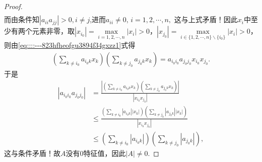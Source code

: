 \documentclass[../../main.tex]{subfiles}%
\begin{document}
\begin{proof}
\begin{align*}
\end{align*}
而由条件知$|a_{ii}a_{jj}|>0,i\neq j$,进而$a_{ii}\neq 0,\,i=1,2,\cdots,n,$
这与上式矛盾！因此$x_i$中至少有两个元素非零，取$|x_{i_0}|=\max\limits_{i=1,2,\cdots,n}|x_i|>0$，$|x_{j_0}|=\max\limits_{i\in\{1,2,\cdots,n\}\backslash\{i_0\}}|x_i|>0$，则由\eqref{eq::::---823hfheofgu3894f34gxzz1}式得
\begin{align*}
\left( \sum\limits_{k\ne i_0} a_{i_0k}x_k \right)\left( \sum\limits_{k\ne j_0} a_{j_0k}x_k \right) =a_{i_0i_0}a_{j_0j_0}x_{i_0}x_{j_0}.
\end{align*}
于是
\begin{align*}
|a_{i_0i_0}a_{j_0j_0}|&=\frac{\left| \left( \sum\limits_{k\ne i_0} a_{i_0k}x_k \right)\left( \sum\limits_{k\ne j_0} a_{j_0k}x_k \right) \right|}{|x_{i_0}x_{j_0}|} \\
&\leqslant \frac{\left( \sum\limits_{k\ne i_0} |a_{i_0k}||x_k| \right)\left( \sum\limits_{k\ne j_0} |a_{j_0k}||x_k| \right)}{|x_{i_0}x_{j_0}|} \\
&\leqslant \left( \sum\limits_{k\ne i_0} |a_{i_0k}| \right)\left( \sum\limits_{k\ne j_0} |a_{j_0k}| \right),
\end{align*}
这与条件矛盾！故$A$没有$0$特征值，因此$|A|\ne 0.$
\end{proof}
\end{document}
